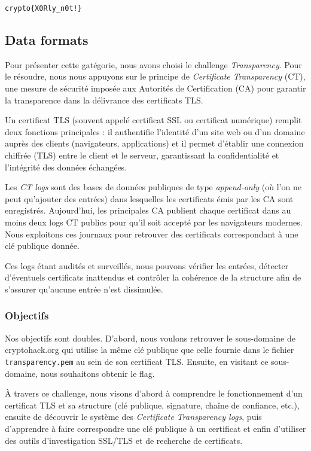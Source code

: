 \begin{center}
    \texttt{crypto\{X0Rly\_n0t!\}}
\end{center}


\subsection{Data formats}

Pour présenter cette gatégorie, nous avons choisi le challenge \textit{Transparency}. Pour le résoudre, nous nous appuyons sur le principe de \emph{Certificate Transparency} (CT), une mesure de sécurité imposée aux Autorités de Certification (CA) pour garantir la transparence dans la délivrance des certificats TLS.

Un certificat TLS (souvent appelé certificat SSL ou certificat numérique) remplit deux fonctions principales : il authentifie l'identité d'un site web ou d'un domaine auprès des clients (navigateurs, applications) et il permet d'établir une connexion chiffrée (TLS) entre le client et le serveur, garantissant la confidentialité et l'intégrité des données échangées.

Les \emph{CT logs} sont des bases de données publiques de type \textit{append-only} (où l'on ne peut qu'ajouter des entrées) dans lesquelles les certificats émis par les CA sont enregistrés. Aujourd'hui, les principales CA publient chaque certificat dans au moins deux logs CT publics pour qu'il soit accepté par les navigateurs modernes. Nous exploitons ces journaux pour retrouver des certificats correspondant à une clé publique donnée.

Ces logs étant audités et surveillés, nous pouvons vérifier les entrées, détecter d'éventuels certificats inattendus et contrôler la cohérence de la structure  afin de s'assurer qu'aucune entrée n'est dissimulée.

\subsubsection{Objectifs}
Nos objectifs sont doubles. D'abord, nous voulons retrouver le sous-domaine de cryptohack.org qui utilise la même clé publique que celle fournie dans le fichier \texttt{transparency.pem} au sein de son certificat TLS. Ensuite, en visitant ce sous-domaine, nous souhaitons obtenir le flag.

À travers ce challenge, nous visons d'abord à comprendre le fonctionnement d’un certificat TLS et sa structure (clé publique, signature, chaîne de confiance, etc.), ensuite de découvrir le système des \textit{Certificate Transparency logs}, puis d'apprendre à faire correspondre une clé publique à un certificat et enfin d'utiliser des outils d’investigation SSL/TLS et de recherche de certificats.

